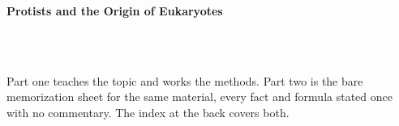 



\makeindex[title={Index of This Volume},columns=2,intoc]

\begin{titlepage}\thispagestyle{empty}
\vspace*{0.14\textheight}
\noindent{\color{tiercore}\rule{\textwidth}{5pt}}\\[3pt]
\noindent{\color{bioline}\rule{\textwidth}{1pt}}\\[26pt]
\\[12pt]
\noindent\begin{minipage}{\textwidth}\raggedright
{\sffamily\bfseries\fontsize{28}{32}\selectfont\color{bioink}%
 \hyphenchar{} Protists and the Origin of Eukaryotes\par}\end{minipage}\\[16pt]
\noindent{\color{biogreen}\rule{\textwidth}{1.4pt}}\\[10pt]
\noindent\begin{minipage}{\textwidth}\raggedright
{\fontsize{10.5}{14}\selectfont\color{biogreen}%
Part one teaches the topic and works the methods. Part two is the bare memorization sheet for the
same material, every fact and formula stated once with no commentary. The index at the back covers both.\par}\end{minipage}
\vfill
\noindent{\color{bioline}\rule{\textwidth}{1pt}}\\[3pt]
\noindent{\color{tiercore}\rule{\textwidth}{5pt}}
\end{titlepage}
\tableofcontents
\clearpage
{}
\clearpage
\printindex

